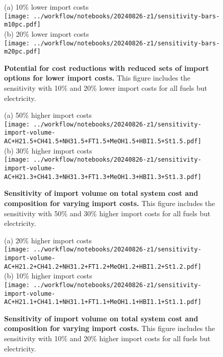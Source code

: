 \begin{figure}[!htb]
    \footnotesize
    (a) 10\% lower import costs \\
    \texttt{[image: ../workflow/notebooks/20240826-z1/sensitivity-bars-m10pc.pdf]} \\
    (b) 20\% lower import costs \\
    \texttt{[image: ../workflow/notebooks/20240826-z1/sensitivity-bars-m20pc.pdf]} \\
    \caption{\textbf{Potential for cost reductions with reduced sets of import options for lower import costs.} This figure includes the sensitivity with
    10\% and 20\% lower import costs for all fuels but electricity.}
    \label{fig:si:subsets-lower}
\end{figure}

\begin{figure*}
    \small
    (a) 50\% higher import costs \\
    \texttt{[image: ../workflow/notebooks/20240826-z1/sensitivity-import-volume-AC+H21.5+CH41.5+NH31.5+FT1.5+MeOH1.5+HBI1.5+St1.5.pdf]} \\
    (b) 30\% higher import costs \\
    \texttt{[image: ../workflow/notebooks/20240826-z1/sensitivity-import-volume-AC+H21.3+CH41.3+NH31.3+FT1.3+MeOH1.3+HBI1.3+St1.3.pdf]} \\
    \caption{\textbf{Sensitivity of import volume on total system cost and composition for varying import costs.} This figure includes the sensitivity with
    50\% and 30\% higher import costs for all fuels but electricity.}
    \label{fig:si:volume-higher-2}
\end{figure*}

\begin{figure*}
    \small
    (a) 20\% higher import costs \\
    \texttt{[image: ../workflow/notebooks/20240826-z1/sensitivity-import-volume-AC+H21.2+CH41.2+NH31.2+FT1.2+MeOH1.2+HBI1.2+St1.2.pdf]} \\
    (b) 10\% higher import costs \\
    \texttt{[image: ../workflow/notebooks/20240826-z1/sensitivity-import-volume-AC+H21.1+CH41.1+NH31.1+FT1.1+MeOH1.1+HBI1.1+St1.1.pdf]} \\
    \caption{\textbf{Sensitivity of import volume on total system cost and composition for varying import costs.} This figure includes the sensitivity with
    10\% and 20\% higher import costs for all fuels but electricity.}
    \label{fig:si:volume-higher-1}
\end{figure*}

